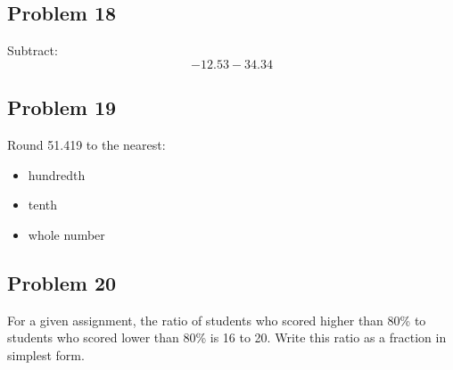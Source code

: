\documentclass[12pt]{article}
\begin{document}
\subsection*{Problem 18}
Subtract:  
\[
-12.53 - 34.34
\]

\newpage
\subsection*{Problem 19}
Round 51.419 to the nearest:
\begin{itemize}
    \item hundredth
    \item tenth
    \item whole number
\end{itemize}

\subsection*{Problem 20}
For a given assignment, the ratio of students who scored higher than 80\% to students who scored lower than 80\% is 16 to 20.  
Write this ratio as a fraction in simplest form.
\end{document}
